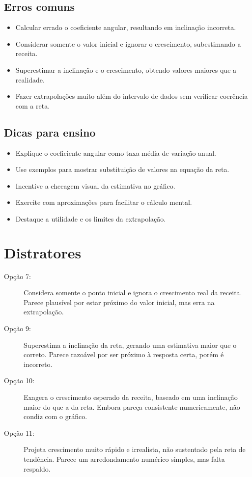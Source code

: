 \documentclass{article}
\begin{document}
\subsection*{Erros comuns}
\begin{itemize}
  \item Calcular errado o coeficiente angular, resultando em inclinação incorreta.
  \item Considerar somente o valor inicial e ignorar o crescimento, subestimando a receita.
  \item Superestimar a inclinação e o crescimento, obtendo valores maiores que a realidade.
  \item Fazer extrapolações muito além do intervalo de dados sem verificar coerência com a reta.
\end{itemize}

\subsection*{Dicas para ensino}
\begin{itemize}
  \item Explique o coeficiente angular como taxa média de variação anual.
  \item Use exemplos para mostrar substituição de valores na equação da reta.
  \item Incentive a checagem visual da estimativa no gráfico.
  \item Exercite com aproximações para facilitar o cálculo mental.
  \item Destaque a utilidade e os limites da extrapolação.
\end{itemize}

\section*{Distratores}

\begin{description}
  \item[Opção 7:] Considera somente o ponto inicial e ignora o crescimento real da receita. Parece plausível por estar próximo do valor inicial, mas erra na extrapolação.

  \item[Opção 9:] Superestima a inclinação da reta, gerando uma estimativa maior que o correto. Parece razoável por ser próximo à resposta certa, porém é incorreto.

  \item[Opção 10:] Exagera o crescimento esperado da receita, baseado em uma inclinação maior do que a da reta. Embora pareça consistente numericamente, não condiz com o gráfico.

  \item[Opção 11:] Projeta crescimento muito rápido e irrealista, não sustentado pela reta de tendência. Parece um arredondamento numérico simples, mas falta respaldo.
\end{description}
\end{document}
